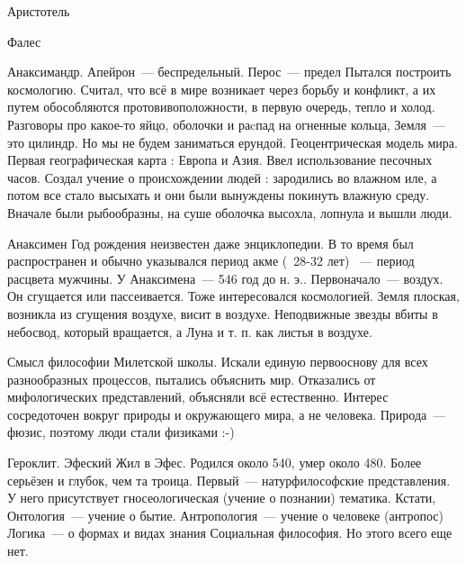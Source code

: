 Аристотель

Фалес

Анаксимандр. 
Апейрон~--- беспредельный. Перос~--- предел
Пытался построить космологию. Считал, что всё в мире возникает через борьбу и конфликт, а их путем обособляются протовивоположности, в первую очередь, тепло и холод. 
Разговоры про какое-то яйцо, оболочки и раcпад на огненные кольца, Земля~--- это цилиндр. 
Но мы не будем заниматься ерундой. 
Геоцентрическая модель мира. Первая географическая карта : Европа и Азия. Ввел использование песочных часов. 
Создал учение о происхождении людей : зародились во влажном иле, а потом все стало высыхать и они были вынуждены покинуть влажную среду. Вначале были рыбообразны, на суше оболочка высохла, лопнула и вышли люди. 

Анаксимен
Год рождения неизвестен даже энциклопедии. 
В то время был распространен и обычно указывался период акме (~28-32 лет) ~--- период расцвета мужчины. 
У Анаксимена~--- 546 год до н. э.. 
Первоначало~--- воздух. Он сгущается или пассеивается. 
Тоже интересовался космологией. Земля плоская, возникла из сгущения воздухе, висит в воздухе. 
Неподвижные звезды вбиты в небосвод, который вращается, а Луна и т. п. как листья в воздухе. 

Смысл философии Милетской школы. 
Искали единую первооснову для всех разнообразных процессов, пытались объяснить мир. 
Отказались от мифологических представлений, объясняли всё естественно. 
Интерес сосредоточен вокруг природы и окружающего мира, а не человека. Природа~--- фюзис, поэтому люди стали физиками :-) 

Героклит. Эфеский
Жил в Эфес. Родился около 540, умер около 480. Более серьёзен и глубок, чем та троица. 
Первый~--- натурфилософские представления. У него присутствует гносеологическая (учение о познании) тематика. 
Кстати, 
Онтология~--- учение о бытие. 
Антропология~--- учение о человеке (антропос) 
Логика~--- о формах и видах знания
Социальная философия. Но этого всего еще нет. 

